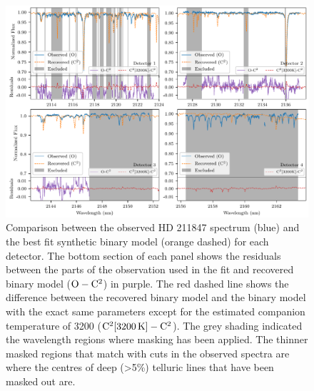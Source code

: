 \begin{figure}
    \centering
    \includegraphics[width=0.7\linewidth]{figures/companion_recovery/visualize_result_residuals}
    \caption[Comparison between observation of {HD 211847} and the best fit synthetic binary model.]{Comparison between the observed {HD 211847} spectrum (blue) and the best fit synthetic binary model (orange dashed) for each detector.
        The bottom section of each panel shows the residuals between the parts of the observation used in the \textchisquared{} fit and recovered binary model (\(\rm O-C^2\)) in purple.
        The red dashed line shows the difference between the recovered binary model and the binary model with the exact same parameters except for the estimated companion temperature of 3200\K{} (\(\rm C^2[3200\,\si{\kelvin}{}]- C^2\)).
        The grey shading indicated the wavelength regions where masking has been applied.
        The thinner masked regions that match with cuts in the observed spectra are where the centres of deep (>5\%) telluric lines that have been masked out are.}
    \label{fig:visualinspection-hd2118471}
\end{figure}
